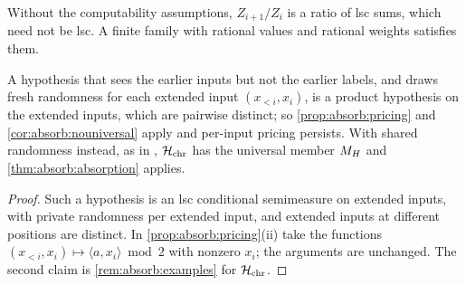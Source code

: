 Without the computability assumptions, $Z_{i+1}/Z_i$ is a ratio of lsc sums, which need not be lsc. A finite family with rational values and rational weights satisfies them.

\begin{proposition}\label{prop:absorb:inputs}
A hypothesis that sees the earlier inputs but not the earlier labels, and draws fresh randomness for each extended input $(x_{<i},x_i)$, is a product hypothesis on the extended inputs, which are pairwise distinct; so \cref{prop:absorb:pricing} and \cref{cor:absorb:nouniversal} apply and per-input pricing persists. With shared randomness instead, as in \SFIhist{}, $\mathcal{H}_{\mathrm{chr}}$ has the universal member $M_{H}$ and \cref{thm:absorb:absorption} applies.
\end{proposition}

\begin{proof} Such a hypothesis is an lsc conditional semimeasure on extended inputs, with private randomness per extended input, and extended inputs at different positions are distinct. In \cref{prop:absorb:pricing}(ii) take the functions $(x_{<i},x_i)\mapsto\langle a,x_i\rangle\bmod2$ with nonzero $x_i$; the arguments are unchanged. The second claim is \cref{rem:absorb:examples} for $\mathcal{H}_{\mathrm{chr}}$.
\end{proof}
